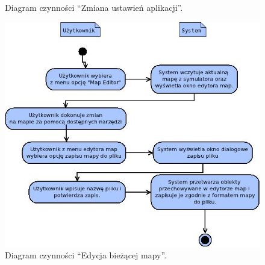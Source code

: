 \begin{par}
\begin{figure}[!h]
		\caption{Diagram czynności ``Zmiana ustawień aplikacji''.}
		\label{fig:sterowanie}
		\end{figure}
		\begin{figure}[!h]
		\centering
		\includegraphics[width=\textwidth]{obrazki/czynnosci_edytor_map.jpeg}
		\caption{Diagram czynności ``Edycja bieżącej mapy''.}
		\label{fig:sterowanie}
		\end{figure}
		\FloatBarrier
\end{par}

